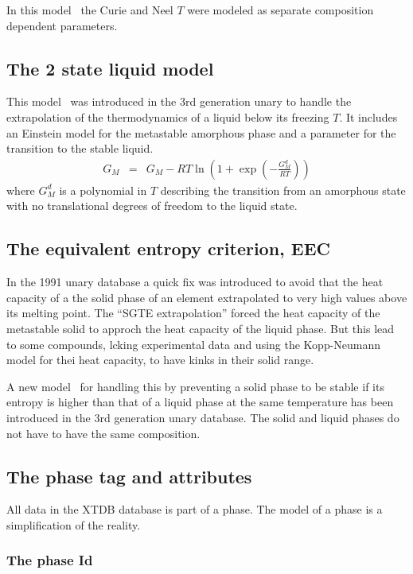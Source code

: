 \documentclass{article}
\begin{document}
In this model~\cite{11Xio,12Xio} the Curie and Neel $T$ were modeled
as separate composition dependent parameters.

\subsection{The 2 state liquid model}\label{sec:liq2state}

This model~\cite{88Agr, 13Bec} was introduced in the 3rd generation
unary to handle the extrapolation of the thermodynamics of a liquid
below its freezing $T$.  It includes an Einstein model for the
metastable amorphous phase and a parameter for the transition to the
stable liquid.
\begin{eqnarray}
G_M &=& G_M - RT\ln(1+\exp(-\frac{G^d_M}{RT})) \label{eq:gl2state}
\end{eqnarray}
where $G^d_M$ is a polynomial in $T$ describing the transition from an
amorphous state with no translational degrees of freedom to the liquid
state.

\subsection{The equivalent entropy criterion, EEC}\label{sec:eec}

In the 1991 unary database a quick fix was introduced to avoid that
the heat capacity of a the solid phase of an element extrapolated to
very high values above its melting point.  The ``SGTE extrapolation''
forced the heat capacity of the metastable solid to approch the heat
capacity of the liquid phase.  But this lead to some compounds, lcking
experimental data and using the Kopp-Neumann model for thei heat
capacity, to have kinks in their solid range.

A new model~\cite{21Sun} for handling this by preventing a solid phase
to be stable if its entropy is higher than that of a liquid phase at
the same temperature has been introduced in the 3rd generation unary
database.  The solid and liquid phases do not have to have the same
composition.

\subsection{The phase tag and attributes}\label{sec:phasetag}

All data in the XTDB database is part of a phase.  The model of a
phase is a simplification of the reality.

\subsubsection{The phase Id}\label{sec:phaseid}
\end{document}
